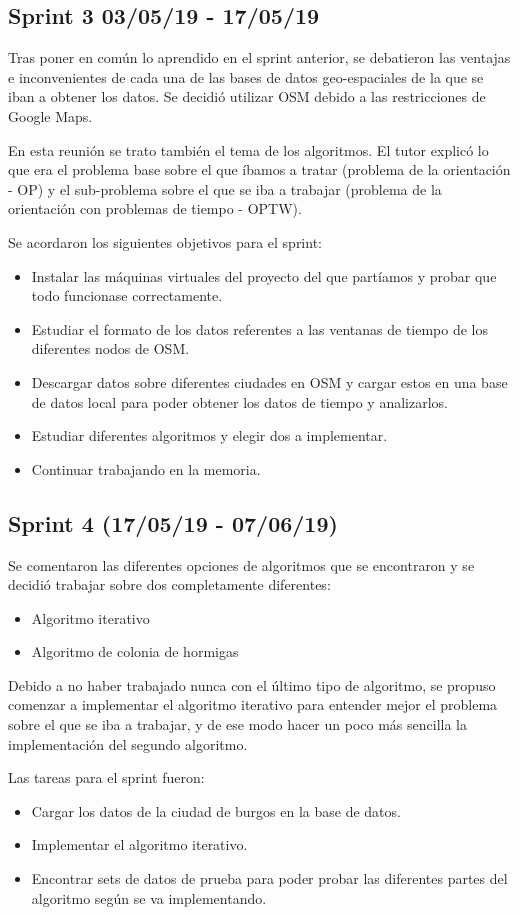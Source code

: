 \subsection{Sprint 3 03/05/19 - 17/05/19}
Tras poner en común lo aprendido en el sprint anterior, se debatieron las ventajas e inconvenientes de cada una de las bases de datos geo-espaciales de la que se iban a obtener los datos.
Se decidió utilizar OSM debido a las restricciones de Google Maps.

En esta reunión se trato también el tema de los algoritmos. El tutor explicó lo que era el problema base sobre el que íbamos a tratar (problema de la orientación - OP) y el sub-problema sobre el que se iba a trabajar (problema de la orientación con problemas de tiempo - OPTW).

Se acordaron los siguientes objetivos para el sprint:
\begin{itemize}
\item Instalar las máquinas virtuales del proyecto del que partíamos y probar que todo funcionase correctamente.
\item Estudiar el formato de los datos referentes a las ventanas de tiempo de los diferentes nodos de OSM.
\item Descargar datos sobre diferentes ciudades en OSM y cargar estos en una base de datos local para poder obtener los datos de tiempo y analizarlos.
\item Estudiar diferentes algoritmos y elegir dos a implementar.
\item Continuar trabajando en la memoria.
\end{itemize}
\subsection{Sprint 4 (17/05/19 - 07/06/19)}
Se comentaron las diferentes opciones de algoritmos que se encontraron y se decidió trabajar sobre dos completamente diferentes:
\begin{itemize}
\item Algoritmo iterativo
\item Algoritmo de colonia de hormigas
\end{itemize}

Debido a no haber trabajado nunca con el último tipo de algoritmo, se propuso comenzar a implementar el algoritmo iterativo para entender mejor el problema sobre el que se iba a trabajar, y de ese modo hacer un poco más sencilla la implementación del segundo algoritmo.

Las tareas para el sprint fueron:
\begin{itemize}
\item Cargar los datos de la ciudad de burgos en la base de datos.
\item Implementar el algoritmo iterativo.
\item Encontrar sets de datos de prueba para poder probar las diferentes partes del algoritmo según se va implementando.
\end{itemize}
